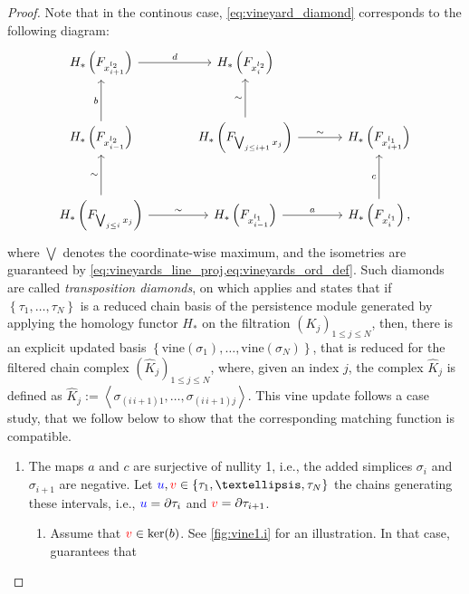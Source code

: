 \documentclass{article}
\newcommand{\vine}{\mathrm{vine}}
\begin{document}
\begin{proof}
	Note that in the continous case, \cref{eq:vineyard_diamond}
	corresponds to the following diagram:
	\begin{equation}
		\begin{tikzcd}[column sep=3.5em, row sep=3em]
			H_*\left(F_{x_{i+1}^{l_2}}\right) \arrow[r, "d"] &  H_*\left(F_{x_{i}^{l_2}}\right) & \\
			H_*\left(F_{x_{i-1}^{l_2}}\right)\arrow[u, "b"]&  H_*\left(F_{\bigvee_{j\le i+1} x_j}\right) \arrow[r, "\sim"] \arrow[u, "\sim"] & H_*\left(F_{x_{i+1}^{l_1}}\right)  \\
			H_*\left(F_{\bigvee_{j\le i} x_j}\right) \arrow[u, "\sim"] \arrow[r,"\sim"]  & H_*\left(F_{x_{i-1}^{l_1}}\right)\arrow[r, "a"]& H_*\left(F_{x_i^{l_1}}\right),\arrow[u, "c"]
		\end{tikzcd}
	\end{equation}
	where $\bigvee$ denotes the coordinate-wise maximum, and the isometries are guaranteed by \cref{eq:vineyards_line_proj,eq:vineyards_ord_def}.
	Such diamonds are called {\em transposition diamonds}, on which \cite[Theorem
	2.4]{mariaZigzagPersistenceReflections2015} applies and states that
	if $\left\{ \tau_1, \dots, \tau_N \right\}$ is a reduced chain basis of
	the persistence module generated by applying the homology functor $H_*$ on the filtration $ \left( K_j \right)_{1\le j \le N}$,
	then, there is an explicit updated basis
	$\left\{ \vine(\sigma_1),\dots,\vine(\sigma_N) \right\}$,
	that is reduced for the filtered chain complex $( \hat K_j)_{1\le j
	\le N}$, where, given an index $j$, the complex $\hat K_j$ is defined as
	$\hat K_j := \left< \sigma_{(i\, i+1)1}, \dots, \sigma_{(i\, i+1) j}
	\right>$.
	This vine update follows a case study, that we follow below to show that the corresponding  matching function is compatible.
	\begin{enumerate}
			\def\v{{\ensuremath{\color{red} v}}}
			\def\u{{\ensuremath{\color{blue} u}}}
		\item The maps $a$ and $c$ are surjective of nullity 1, i.e., the added simplices $\sigma_i$ and $\sigma_{i+1}$ are negative.
			Let $\u,\v\in \left\{ \tau_1, \dots, \tau_N \right\}$ the chains
			generating these intervals, i.e., $\u =\partial \tau_i$ and $\v=\partial
			\tau_{i+1}$.
			\begin{enumerate}
				\item {}{} \label{vine:case1i}
					Assume that $\v\in \ker(b)$.
					See \cref{fig:vine1.i} for an illustration.
					In that case,
					\cite[Theorem 2.4]{mariaZigzagPersistenceReflections2015} guarantees that

\end{enumerate}
\end{enumerate}
\end{proof}
\end{document}

